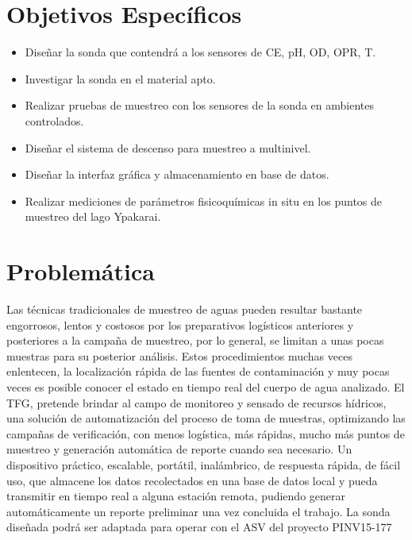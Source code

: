 \section{Objetivos Específicos} \label{Objetivos}
\begin{itemize}
	\item Dise\~nar la sonda que contendrá a los sensores de CE, pH, OD, OPR, T.
    \item Investigar la sonda en el material apto.
    \item Realizar pruebas de muestreo con los sensores de la sonda en ambientes controlados.
    \item Dise\~nar el sistema de descenso para muestreo a multinivel.
    \item Dise\~nar la interfaz gráfica y almacenamiento en base de datos.  
    \item Realizar mediciones de par\'ametros fisicoqu\'imicas in situ en los puntos de muestreo del lago Ypakarai.
\end{itemize}

\section{Problemática} 
Las técnicas tradicionales de muestreo  de aguas pueden resultar bastante engorrosos, lentos y costosos por los preparativos logísticos anteriores y posteriores a la campaña de muestreo, por lo general, se limitan a unas pocas muestras para su posterior análisis. 
Estos procedimientos muchas veces enlentecen, la localizaci\'on rápida de las fuentes de contaminación y muy pocas veces es posible conocer el estado en tiempo real del cuerpo de agua analizado. 
El TFG, pretende brindar al campo de monitoreo y sensado de recursos h\'idricos, una soluci\'on de automatizaci\'on del proceso de toma de muestras, optimizando  las campañas de verificaci\'on, con menos log\'istica, m\'as r\'apidas,  mucho m\'as puntos de muestreo y generaci\'on autom\'atica de reporte cuando sea necesario. 
Un dispositivo pr\'actico, escalable, portátil, inalámbrico, de respuesta rápida, de fácil uso, que almacene los datos recolectados en una base de datos local y pueda transmitir en tiempo real a alguna estación remota, pudiendo generar automáticamente un reporte preliminar una vez concluida el trabajo. 
La sonda diseñada podr\'a ser adaptada para operar con el ASV del proyecto PINV15-177

